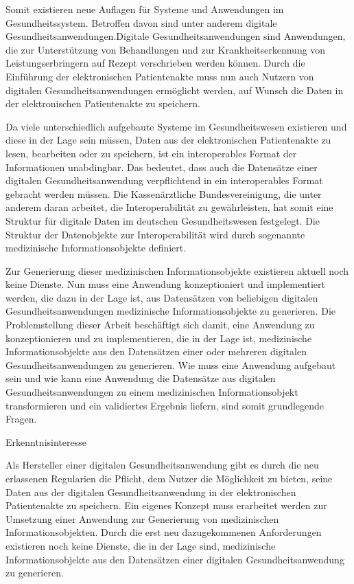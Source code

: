 Somit existieren neue Auflagen für Systeme und Anwendungen im Gesundheitssystem. Betroffen davon sind unter anderem digitale Gesundheitsanwendungen.Digitale Gesundheitsanwendungen sind Anwendungen, die zur Unterstützung von Behandlungen und zur Krankheitserkennung von Leistungserbringern auf Rezept verschrieben werden können. Durch die Einführung der elektronischen Patientenakte muss nun auch Nutzern von digitalen Gesundheitsanwendungen ermöglicht werden, auf Wunsch die Daten in der elektronischen Patientenakte zu speichern. 

Da viele unterschiedlich aufgebaute Systeme im Gesundheitswesen existieren und diese in der Lage sein müssen, Daten aus der elektronischen Patientenakte zu lesen, bearbeiten oder zu speichern, ist ein interoperables Format der Informationen unabdingbar. Das bedeutet, dass auch die Datensätze einer digitalen Gesundheitsanwendung verpflichtend in ein interoperables Format gebracht werden müssen. 
Die Kassenärztliche Bundesvereinigung, die unter anderem daran arbeitet, die Interoperabilität zu gewährleisten, hat somit eine Struktur für digitale Daten im deutschen Gesundheitswesen festgelegt. Die Struktur der Datenobjekte zur Interoperabilität wird durch sogenannte medizinische Informationsobjekte definiert.

Zur Generierung dieser medizinischen Informationsobjekte existieren aktuell noch keine Dienste. Nun muss eine Anwendung konzeptioniert und implementiert werden, die dazu in der Lage ist, aus Datensätzen von beliebigen digitalen Gesundheitsanwendungen medizinische Informationsobjekte zu generieren.
Die Problemstellung dieser Arbeit beschäftigt sich damit, eine Anwendung zu konzeptionieren und zu implementieren, die in der Lage ist, medizinische Informationsobjekte aus den Datensätzen einer oder mehreren digitalen Gesundheitsanwendungen zu generieren. 
Wie muss eine Anwendung aufgebaut sein und wie kann eine Anwendung die Datensätze aus digitalen Gesundheitsanwendungen zu einem medizinischen Informationsobjekt transformieren und ein validiertes Ergebnis liefern, sind somit grundlegende Fragen.



Erkenntnisinteresse

Als Hersteller einer digitalen Gesundheitsanwendung gibt es durch die neu erlassenen Regularien die Pflicht, dem Nutzer die Möglichkeit zu bieten, seine Daten aus der digitalen Gesundheitsanwendung in der elektronischen Patientenakte zu speichern. Ein eigenes Konzept muss erarbeitet werden zur Umsetzung einer Anwendung zur Generierung von medizinischen Informationsobjekten. Durch die erst neu dazugekommenen Anforderungen existieren noch keine Dienste, die in der Lage sind, medizinische Informationsobjekte aus den Datensätzen einer digitalen Gesundheitsanwendung zu generieren. 

